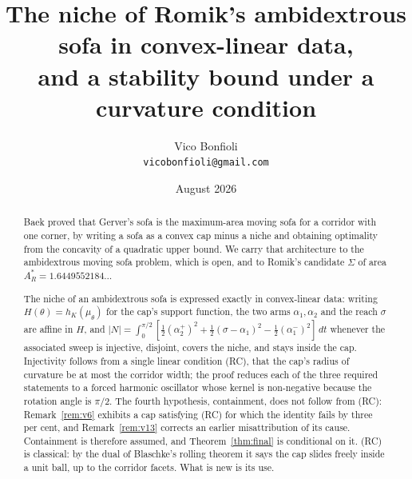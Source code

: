 \documentclass[11pt]{article}
\title{The niche of Romik's ambidextrous sofa in convex-linear data,\\
and a stability bound under a curvature condition}
\author{Vico Bonfioli\\ \small\texttt{vicobonfioli@gmail.com}}
\date{August 2026}
\theoremstyle{definition}
\newcommand{\Sig}{\Sigma}
\begin{document}
\maketitle

\begin{abstract}
Baek proved that Gerver's sofa is the maximum-area moving sofa for a corridor with one
corner, by writing a sofa as a convex cap minus a niche and obtaining optimality from the
concavity of a quadratic upper bound. We carry that architecture to the ambidextrous
moving sofa problem, which is open, and to Romik's candidate $\Sig$ of area
$A_R^\ast=1.6449552184\ldots$

The niche of an ambidextrous sofa is expressed exactly in convex-linear data: writing
$H(\theta)=h_K(\mu_\theta)$ for the cap's support function, the two arms
$\alpha_1,\alpha_2$ and the reach $\sigma$ are affine in $H$, and
$|N|=\int_0^{\pi/2}[\tfrac12(\alpha_2^+)^2+\tfrac12(\sigma-\alpha_1)^2
-\tfrac12(\alpha_1^-)^2]\,dt$ whenever the associated sweep is injective, disjoint,
covers the niche, and stays inside the cap. Injectivity
follows from a single linear condition (RC), that the cap's radius of curvature be at most
the corridor width; the proof reduces each of the three required statements to a forced
harmonic oscillator whose kernel is non-negative because the rotation angle is $\pi/2$. The
fourth hypothesis, containment, does not follow from (RC): Remark~\ref{rem:v6} exhibits a
cap satisfying (RC) for which the identity fails by three per cent, and
Remark~\ref{rem:v13} corrects an earlier misattribution of its cause. Containment is
therefore assumed, and Theorem~\ref{thm:final} is conditional on it.
(RC) is classical: by the dual of Blaschke's rolling theorem it says the cap slides
freely inside a unit ball, up to the corridor facets. What is new is its use.


\end{abstract}
\end{document}
